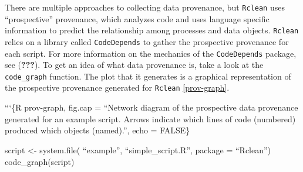 \documentclass[]{article}
\begin{document}
There are multiple approaches to collecting data provenance, but
\texttt{Rclean} uses ``prospective'' provenance, which analyzes code and
uses language specific information to predict the relationship among
processes and data objects. \texttt{Rclean} relies on a library called
\texttt{CodeDepends} to gather the prospective provenance for each
script. For more information on the mechanics of the
\texttt{CodeDepends} package, see ({\textbf{???}}). To get an idea of
what data provenance is, take a look at the \texttt{code\_graph}
function. The plot that it generates is a graphical representation of
the prospective provenance generated for \texttt{Rclean}
\ref{prov-graph}.

```\{R prov-graph, fig.cap = ``Network diagram of the prospective data
provenance generated for an example script. Arrows indicate which lines
of code (numbered) produced which objects (named).'', echo = FALSE\}

script \textless{}- system.file( ``example'', ``simple\_script.R'',
package = ``Rclean'') code\_graph(script)
\end{document}

